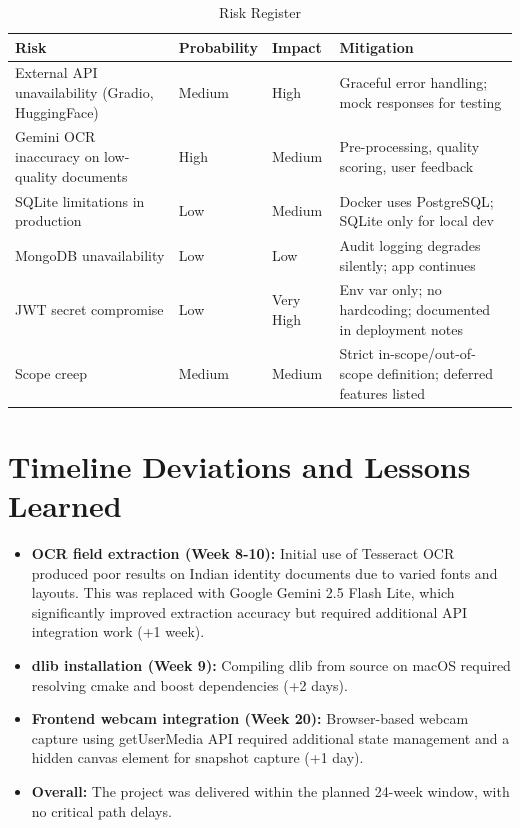 \documentclass[12pt,a4paper]{report}
\begin{document}
\begin{table}[H]
\centering
\caption{Risk Register}
\begin{tabular}{@{}p{3.5cm}p{1.5cm}p{1.5cm}p{4.5cm}@{}}
\toprule
\textbf{Risk} & \textbf{Probability} & \textbf{Impact} & \textbf{Mitigation} \\
\midrule
External API unavailability (Gradio, HuggingFace) & Medium & High & Graceful error handling; mock responses for testing \\
Gemini OCR inaccuracy on low-quality documents & High & Medium & Pre-processing, quality scoring, user feedback \\
SQLite limitations in production & Low & Medium & Docker uses PostgreSQL; SQLite only for local dev \\
MongoDB unavailability & Low & Low & Audit logging degrades silently; app continues \\
JWT secret compromise & Low & Very High & Env var only; no hardcoding; documented in deployment notes \\
Scope creep & Medium & Medium & Strict in-scope/out-of-scope definition; deferred features listed \\
\bottomrule
\end{tabular}
\end{table}

\section{Timeline Deviations and Lessons Learned}

\begin{itemize}
    \item \textbf{OCR field extraction (Week 8-10):} Initial use of Tesseract OCR produced poor results on Indian identity documents due to varied fonts and layouts. This was replaced with Google Gemini 2.5 Flash Lite, which significantly improved extraction accuracy but required additional API integration work (+1 week).
    \item \textbf{dlib installation (Week 9):} Compiling dlib from source on macOS required resolving cmake and boost dependencies (+2 days).
    \item \textbf{Frontend webcam integration (Week 20):} Browser-based webcam capture using getUserMedia API required additional state management and a hidden canvas element for snapshot capture (+1 day).
    \item \textbf{Overall:} The project was delivered within the planned 24-week window, with no critical path delays.
\end{itemize}
\end{document}

